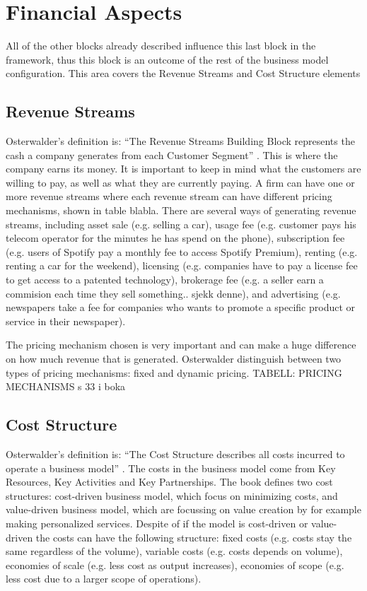 \section{Financial Aspects}
All of the other blocks already described influence this last block in the framework, thus this block is an outcome of the rest of the business model configuration. This area covers the Revenue Streams and Cost Structure elements \cite{osterwalderthesis}

\subsection{Revenue Streams}
Osterwalder’s definition is: “The Revenue Streams Building Block represents the cash a company generates from each Customer Segment” \cite{osterwalder}. This is where the company earns its money. It is important to keep in mind what the customers are willing to pay, as well as what they are currently paying. A firm can have one or more revenue streams where each revenue stream can have different pricing mechanisms, shown in table blabla. There are several ways of generating revenue streams, including asset sale (e.g. selling a car), usage fee (e.g. customer pays his telecom operator for the minutes he has spend on the phone), subscription fee (e.g. users of Spotify pay a monthly fee to access Spotify Premium), renting (e.g. renting a car for the weekend), licensing (e.g. companies have to pay a license fee to get access to a patented technology), brokerage fee (e.g. a seller earn a commision each time they sell something.. sjekk denne), and advertising (e.g. newspapers take a fee for companies who wants to promote a specific product or service in their newspaper). 

The pricing mechanism chosen is very important and can make a huge difference on how much revenue that is generated. Osterwalder distinguish between two types of pricing mechanisms: fixed and dynamic pricing. 
TABELL: PRICING MECHANISMS s 33 i boka

\subsection{Cost Structure}
Osterwalder’s definition is: “The Cost Structure describes all costs incurred to operate a business model” \cite{osterwalder}. The costs in the business model come from Key Resources, Key Activities and Key Partnerships. The book \cite{osterwalder} defines two cost structures: cost-driven business model, which focus on minimizing costs, and value-driven business model, which are focussing on value creation by for example making personalized services. Despite of if the model is cost-driven or value-driven the costs can have the following structure: fixed costs (e.g. costs stay the same regardless of the volume), variable costs (e.g. costs depends on volume), economies of scale (e.g. less cost as output increases), economies of scope (e.g. less cost due to a larger scope of operations). 
